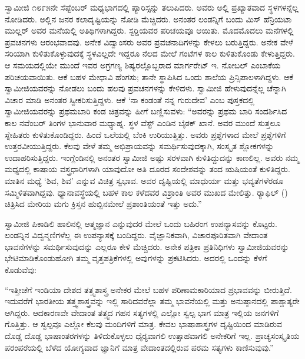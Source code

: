  ಸ್ವಾಮೀಜಿ ೧೮೯೫ನೇ ಸೆಪ್ಟೆಂಬರ್ ಮಧ್ಯಭಾಗದಲ್ಲಿ ಪ್ಯಾರಿಸ್ಸನ್ನು ತಲುಪಿದರು. ಅವರು ಅಲ್ಲಿ ಪ್ರಖ್ಯಾತವಾದ ಸ್ಥಳಗಳನ್ನೆಲ್ಲ ನೋಡಿದರು. ಅಲ್ಲಿನ ಜನರ ಕಲಾದೃಷ್ಟಿಯನ್ನು ನೋಡಿ ಮೆಚ್ಚಿದರು. ಅನಂತರ ಲಂಡನ್ನಿಗೆ ಬಂದು ಮಿಸ್ ಹೆನ್ರಿಯಟಾ ಮುಲ್ಲರ್ ಅವರ ಮನೆಯಲ್ಲಿ ಅತಿಥಿಗಳಾಗಿದ್ದರು. ಸ್ಟರ‍್ಡಿಯವರ ಪರಿಚಯವೂ ಆಯಿತು. ಮೊದಮೊದಲು ಮನೆಗಳಲ್ಲಿ ಪ್ರವಚನಗಳು ಆರಂಭವಾದವು. ಅನೇಕ ವಿದ್ವಾಂಸರು ಅವರ ಪ್ರವಚನಾದಿಗಳನ್ನು ಕೇಳಲು ಬರುತ್ತಿದ್ದರು. ಅನೇಕ ವೇಳೆ ಸರಿಯಾಗಿ ಕುಳಿತುಕೊಳ್ಳುವುದಕ್ಕೆ ಸ್ಥಳವಿಲ್ಲದೇ ಇದ್ದರೂ ನೆಲದ ಮೇಲೆ ಗಂಟೆಗಳ ಕಾಲ ಕುಳಿತುಕೊಂಡು ಕೇಳುತ್ತಿದ್ದರು. ಆ ಸಮಯದಲ್ಲಿಯೇ ಮುಂದೆ ಇವರ ಅಗ್ರಗಣ್ಯ ಶಿಷ್ಯರಲ್ಲೊಬ್ಬರಾದ ಮಾರ್ಗರೇಟ್ ಇ. ನೋಬಲ್ ಎಂಬಾಕೆಯ ಪರಿಚಯವಾಯಿತು. ಆಕೆ ಬಹಳ ಮೇಧಾವಿ ಹೆಂಗಸು; ತಾನೇ ಸ್ಥಾಪಿಸಿದ ಒಂದು ಶಾಲೆಯ ಪ್ರಿನ್ಸಿಪಾಲಳಾಗಿದ್ದಳು. ಆಕೆ ಸ್ವಾಮೀಜಿಯವರನ್ನು ನೋಡಲು ಬಂದು ಹಲವು ಪ್ರವಚನಗಳನ್ನು ಕೇಳಿದಳು. ಸ್ವಾಮೀಜಿ ಹೇಳುವುದನ್ನೆಲ್ಲ ಚೆನ್ನಾಗಿ ವಿಚಾರ ಮಾಡಿ ಅನಂತರ ಸ್ವೀಕರಿಸುತ್ತಿದ್ದಳು. ಆಕೆ ‘ನಾ ಕಂಡಂತೆ ನನ್ನ ಗುರುದೇವ’ ಎಂಬ ಪುಸ್ತಕದಲ್ಲಿ ಸ್ವಾಮೀಜಿಯವರನ್ನು ಪ್ರಥಮಬಾರಿ ಕಂಡ ಚಿತ್ರವನ್ನು ಹೀಗೆ ಬಣ್ಣಿಸುವಳು: “ಅವರನ್ನು ಪ್ರಥಮ ಬಾರಿ ಸಂದರ್ಶಿಸಿದ ಕಾಲ ನವೆಂಬರ್ ತಿಂಗಳ ಭಾನುವಾರ ಮಧ್ಯಾಹ್ನ. ಸ್ಥಳ ವೆಸ್ಟ್ ಎಂಡಿನ ಬೈಠಕ್ ಖಾನೆ. ಅವರ ಮುಂದೆ ಸುತ್ತಲೂ ಸ್ನೇಹಿತರು ಕುಳಿತುಕೊಂಡಿದ್ದರು. ಹಿಂದೆ ಒಲೆಯಲ್ಲಿ ಬೆಂಕಿ ಉರಿಯುತ್ತಿತ್ತು. ಅವರು ಪ್ರಶ್ನೆಗಳಾದ ಮೇಲೆ ಪ್ರಶ್ನೆಗಳಿಗೆ ಉತ್ತರವೀಯುತ್ತಿದ್ದರು. ಕೆಲವು ವೇಳೆ ತಮ್ಮ ಅಭಿಪ್ರಾಯವನ್ನು ಸಮರ್ಥಿಸುವುದಕ್ಕಾಗಿ, ಸಂಸ್ಕೃತ ಶ್ಲೋಕಗಳನ್ನು ಉದಾಹರಿಸುತ್ತಿದ್ದರು. ಇಂಗ್ಲೆಂಡಿನಲ್ಲಿ ಅನಂತರ ಸ್ವಾಮೀಜಿ ಅಷ್ಟು ಸರಳವಾಗಿ ಕುಳಿತಿದ್ದುದನ್ನು ಕಾಣಲಿಲ್ಲ. ಅವರು ನಮ್ಮ ಮಧ್ಯದಲ್ಲಿ ಕಾಷಾಯ ವಸ್ತ್ರಧಾರಿಗಳಾಗಿ ಯಾವುದೋ ಅತಿ ದೂರದ ಸಂದೇಶವನ್ನು ತಂದ ಋಷಿಯಂತೆ ಕುಳಿತಿದ್ದರು. ಮಾತಿನ ಮಧ್ಯೆ ‘ಶಿವ, ಶಿವ’ ಎನ್ನುವ ವಿಚಿತ್ರ ಸ್ವಭಾವ. ಅವರ ದೃಷ್ಟಿಯಲ್ಲಿ ಮಾಧುರ್ಯ ಮತ್ತು ಭವ್ಯತೆಗಳೆರಡೂ ಸಮ್ಮಿಳಿತವಾಗಿದ್ದವು. ಧ್ಯಾನಾವಸ್ಥೆಯಲ್ಲಿ ಬಹಳ ಕಾಲ ಕಳೆದವರ ವಿಶ್ರಾಂತಿ ಅವರ ಮುಖದ ಮೇಲಿತ್ತು. ರ‍್ಯಾಫಿಲ್ () ಚಿತ್ರಿಸಿದ ಮೇರಿಯ ಮಗು ಕ್ರಿಸ್ತನ ಹುಬ್ಬಿನಮೇಲೆ ಪ್ರಶಾಂತಿಯಂತೆ ಇತ್ತು ಅದು.” 

 ಸ್ವಾಮೀಜಿ ಪಿಕಾಡಿಲಿ ಹಾಲಿನಲ್ಲಿ ಆತ್ಮಜ್ಞಾನ ಎನ್ನುವುದರ ಮೇಲೆ ಒಂದು ಬಹಿರಂಗ ಉಪನ್ಯಾಸವನ್ನು ಕೊಟ್ಟರು. ಲಂಡನ್ನಿನ ವಿದ್ವನ್ಮಣಿಗಳೆಲ್ಲ ಈ ಉಪನ್ಯಾಸಕ್ಕೆ ಬಂದಿದ್ದರು. ವೈಜ್ಞಾನಿಕವಾಗಿ, ವಿಚಾರಪೂರಿತವಾಗಿ ವೇದಾಂತ ಭಾವನೆಗಳನ್ನು ಸಮರ್ಥಿಸುವುದನ್ನು ಎಲ್ಲರೂ ಕೇಳಿ ಮೆಚ್ಚಿದರು. ಅನೇಕ ಪತ್ರಿಕಾ ಪ್ರತಿನಿಧಿಗಳು ಸ್ವಾಮೀಜಿಯವರನ್ನು ಭೇಟಿಮಾಡಿಕೊಂಡುಹೋಗಿ ತಮ್ಮ ವೃತ್ತಪತ್ರಿಕೆಗಳಲ್ಲಿ ಅವುಗಳನ್ನು ಪ್ರಕಟಿಸಿದರು. ಅದರಲ್ಲಿ ಒಂದನ್ನು ಕೆಳಗೆ ಕೊಡುವೆವು: 

  “ಇತ್ತೀಚೆಗೆ ಇಂಡಿಯಾ ದೇಶದ ತತ್ತ್ವಶಾಸ್ತ್ರ ಅನೇಕರ ಮೇಲೆ ಬಹಳ ಪರಿಣಾಮಕಾರಿಯಾದ ಪ್ರಭಾವವನ್ನು ಬೀರುತ್ತಿದೆ. ಇದುವರೆಗೆ ಭಾರತೀಯ ತತ್ತ್ವಶಾಸ್ತ್ರವನ್ನು ಇಲ್ಲಿ ಸಾರಿದವರೆಲ್ಲಾ ತಮ್ಮ ಭಾವನೆಯಲ್ಲಿ ಮತ್ತು ಅನುಷ್ಠಾನದಲ್ಲಿ ಪಾಶ್ಚಾತ್ಯರೇ ಆಗಿದ್ದರು. ಆದಕಾರಣವೇ ವೇದಾಂತ ತತ್ತ್ವದ ಗಹನ ಸತ್ಯಗಳಲ್ಲಿ ಎಲ್ಲೋ ಸ್ವಲ್ಪ ಭಾಗ ಮಾತ್ರ ಇಲ್ಲಿಯ ಜನಗಳಿಗೆ ಗೊತ್ತಿತ್ತು. ಆ ಸ್ವಲ್ಪವೂ ಎಲ್ಲೋ ಕೆಲವು ಮಂದಿಗಳಿಗೆ ಮಾತ್ರ. ಕೇವಲ ಭಾಷಾಶಾಸ್ತ್ರಗಳ ದೃಷ್ಟಿಯಿಂದ ಮಾಡಿರುವ ದೊಡ್ಡ ದೊಡ್ಡ ಭಾಷಾಂತರಗಳನ್ನು ತಿಳಿದುಕೊಳ್ಳಲು ಧೈರ‍್ಯವಾಗಲಿ ಉತ್ಸಾಹವಾಗಲಿ ಅನೇಕರಿಗೆ ಇಲ್ಲ. ಪ್ರಾಚ್ಯಸಂಸ್ಕೃತಿಯ ಪರಂಪರೆಯಲ್ಲಿ ಬೆಳೆದ ಯೋಗ್ಯವಾದ ಜ್ಞಾನಿಗೆ ಮಾತ್ರ ವೇದಾಂತದಲ್ಲಿರುವ ಪರಮ ಸತ್ಯಗಳು ಕಾಣಿಸುವುವು.” 

